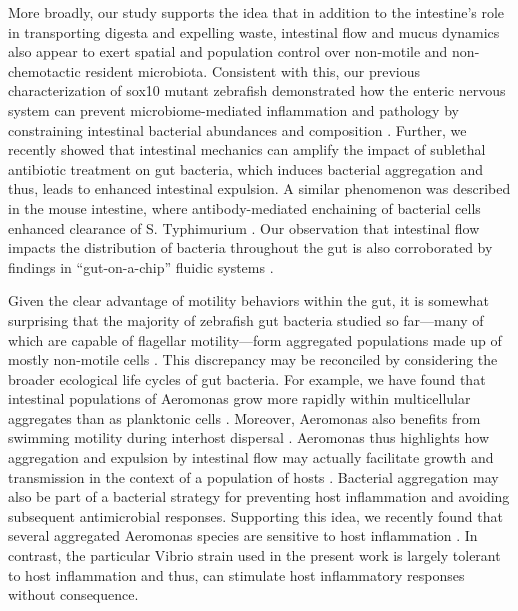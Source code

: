 More broadly, our study supports the idea that in addition to the intestine's role in transporting digesta and expelling waste, intestinal flow and mucus dynamics also appear to exert spatial and population control over non-motile and non-chemotactic resident microbiota. Consistent with this, our previous characterization of sox10 mutant zebrafish demonstrated how the enteric nervous system can prevent microbiome-mediated inflammation and pathology by constraining intestinal bacterial abundances and composition \cite{rolig_enteric_2017}. Further, we recently showed that intestinal mechanics can amplify the impact of sublethal antibiotic treatment on gut bacteria, which induces bacterial aggregation and thus, leads to enhanced intestinal expulsion\cite{schlomann_sublethal_2019}. A similar phenomenon was described in the mouse intestine, where antibody-mediated enchaining of bacterial cells enhanced clearance of S. Typhimurium \cite{moor_high-avidity_2017}. Our observation that intestinal flow impacts the distribution of bacteria throughout the gut is also corroborated by findings in ``gut-on-a-chip'' fluidic systems \cite{cremer_effect_2016}. 

Given the clear advantage of motility behaviors within the gut, it is somewhat surprising that the majority of zebrafish gut bacteria studied so far—many of which are capable of flagellar motility—form aggregated populations made up of mostly non-motile cells \cite{wiles_modernized_2018}. This discrepancy may be reconciled by considering the broader ecological life cycles of gut bacteria. For example, we have found that intestinal populations of Aeromonas grow more rapidly within multicellular aggregates than as planktonic cells \cite{jemielita_spatial_2014}. Moreover, Aeromonas also benefits from swimming motility during interhost dispersal \cite{robinson_experimental_2018}. Aeromonas thus highlights how aggregation and expulsion by intestinal flow may actually facilitate growth and transmission in the context of a population of hosts \cite{robinson_scales_2019}. Bacterial aggregation may also be part of a bacterial strategy for preventing host inflammation and avoiding subsequent antimicrobial responses. Supporting this idea, we recently found that several aggregated Aeromonas species are sensitive to host inflammation \cite{rolig_bacterial_2018}. In contrast, the particular Vibrio strain used in the present work is largely tolerant to host inflammation \cite{rolig_individual_2015} and thus, can stimulate host inflammatory responses without consequence.


